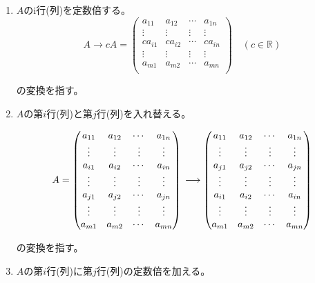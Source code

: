 \documentclass[dvipdfmx,autodetect-engine]{jsarticle}
\begin{document}
\begin{enumerate}
\renewcommand{\labelenumi}{(\arabic{enumi})}
\item $A$のi行(列)を定数倍する。
$$
A \longrightarrow cA = \begin{pmatrix}
a_{11} & a_{12} & \cdots & a_{1n} \\
\vdots & \vdots & \vdots & \vdots \\
ca_{i1} & ca_{i2} & \cdots & ca_{in} \\
\vdots & \vdots & \vdots & \vdots \\
a_{m1} & a_{m2} & \cdots & a_{mn} \\
\end{pmatrix} \quad (c \in \mathbb{R})
$$

の変換を指す。

\item $A$の第$i$行(列)と第$j$行(列)を入れ替える。

$$
A = \begin{pmatrix}
a_{11} & a_{12} & \cdots & a_{1n} \\
\vdots & \vdots & \vdots & \vdots \\
a_{i1} & a_{i2} & \cdots & a_{in} \\
\vdots & \vdots & \vdots & \vdots \\
a_{j1} & a_{j2} & \cdots & a_{jn} \\
\vdots & \vdots & \vdots & \vdots \\
a_{m1} & a_{m2} & \cdots & a_{mn} \\
\end{pmatrix} \\
\longrightarrow \begin{pmatrix}
a_{11} & a_{12} & \cdots & a_{1n} \\
\vdots & \vdots & \vdots & \vdots \\
a_{j1} & a_{j2} & \cdots & a_{jn} \\
\vdots & \vdots & \vdots & \vdots \\
a_{i1} & a_{i2} & \cdots & a_{in} \\
\vdots & \vdots & \vdots & \vdots \\
a_{m1} & a_{m2} & \cdots & a_{mn} \\
\end{pmatrix}
$$

の変換を指す。

\item $A$の第$i$行(列)に第$j$行(列)の定数倍を加える。


\end{enumerate}
\end{document}
